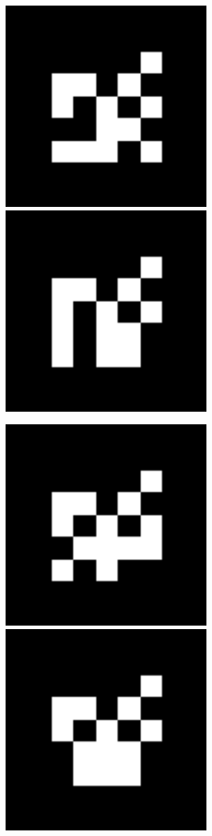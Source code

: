 \documentclass[10pt,letterpaper]{article}
\begin{document}
\includegraphics[width=3in]{MarkerData_129.png}
\includegraphics[width=3in]{MarkerData_130.png}


\includegraphics[width=3in]{MarkerData_131.png}
\includegraphics[width=3in]{MarkerData_132.png}
\end{document}
